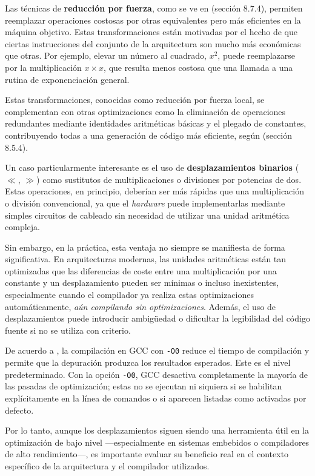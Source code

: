 \documentclass[11pt,a4paper,twoside]{article}
\theoremstyle{definition}
\begin{document}
	Las técnicas de \textbf{reducción por fuerza}, como se ve en \cite{aho} (sección 8.7.4), permiten reemplazar operaciones costosas por otras equivalentes pero más eficientes en la máquina objetivo. Estas transformaciones están motivadas por el hecho de que ciertas instrucciones del conjunto de la arquitectura son mucho más económicas que otras. Por ejemplo, elevar un número al cuadrado, $x^2$, puede reemplazarse por la multiplicación $x \times x$, que resulta menos costosa que una llamada a una rutina de exponenciación general.
	
	Estas transformaciones, conocidas como reducción por fuerza local, se complementan con otras optimizaciones como la eliminación de operaciones redundantes mediante identidades aritméticas básicas y el plegado de constantes, contribuyendo todas a una generación de código más eficiente, según \cite{aho} (sección 8.5.4).
	
	Un caso particularmente interesante es el uso de \textbf{desplazamientos binarios} ($\ll$, $\gg$) como sustitutos de multiplicaciones o divisiones por potencias de dos. Estas operaciones, en principio, deberían ser más rápidas que una multiplicación o división convencional, ya que el \textit{hardware} puede implementarlas mediante simples circuitos de cableado sin necesidad de utilizar una unidad aritmética compleja.
	
	Sin embargo, en la práctica, esta ventaja no siempre se manifiesta de forma significativa. En arquitecturas modernas, las unidades aritméticas están tan optimizadas que las diferencias de coste entre una multiplicación por una constante y un desplazamiento pueden ser mínimas o incluso inexistentes, especialmente cuando el compilador ya realiza estas optimizaciones automáticamente, \textit{aún compilando sin optimizaciones}. Además, el uso de desplazamientos puede introducir ambigüedad o dificultar la legibilidad del código fuente si no se utiliza con criterio.
	
	De acuerdo a \cite{gcc}, la compilación en GCC con \texttt{-O0} reduce el tiempo de compilación y permite que la depuración produzca los resultados esperados. Este es el nivel predeterminado. Con la opción \texttt{-O0}, GCC desactiva completamente la mayoría de las pasadas de optimización; estas no se ejecutan ni siquiera si se habilitan explícitamente en la línea de comandos o si aparecen listadas como activadas por defecto.
	
	Por lo tanto, aunque los desplazamientos siguen siendo una herramienta útil en la optimización de bajo nivel ---especialmente en sistemas embebidos o compiladores de alto rendimiento---, es importante evaluar su beneficio real en el contexto específico de la arquitectura y el compilador utilizados.
	
\end{document}
